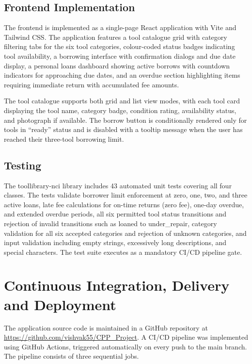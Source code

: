 \documentclass[conference]{IEEEtran}
\begin{document}
\subsection{Frontend Implementation}

The frontend is implemented as a single-page React application with Vite and Tailwind CSS. The application features a tool catalogue grid with category filtering tabs for the six tool categories, colour-coded status badges indicating tool availability, a borrowing interface with confirmation dialogs and due date display, a personal loans dashboard showing active borrows with countdown indicators for approaching due dates, and an overdue section highlighting items requiring immediate return with accumulated fee amounts.

The tool catalogue supports both grid and list view modes, with each tool card displaying the tool name, category badge, condition rating, availability status, and photograph if available. The borrow button is conditionally rendered only for tools in ``ready'' status and is disabled with a tooltip message when the user has reached their three-tool borrowing limit.

\subsection{Testing}

The toollibrary-nci library includes 43 automated unit tests covering all four classes. The tests validate borrower limit enforcement at zero, one, two, and three active loans, late fee calculations for on-time returns (zero fee), one-day overdue, and extended overdue periods, all six permitted tool status transitions and rejection of invalid transitions such as loaned to under\_repair, category validation for all six accepted categories and rejection of unknown categories, and input validation including empty strings, excessively long descriptions, and special characters. The test suite executes as a mandatory CI/CD pipeline gate.

\section{Continuous Integration, Delivery and Deployment}

The application source code is maintained in a GitHub repository at \url{https://github.com/vishvak55/CPP\_Project}. A CI/CD pipeline was implemented using GitHub Actions, triggered automatically on every push to the main branch. The pipeline consists of three sequential jobs.
\end{document}

